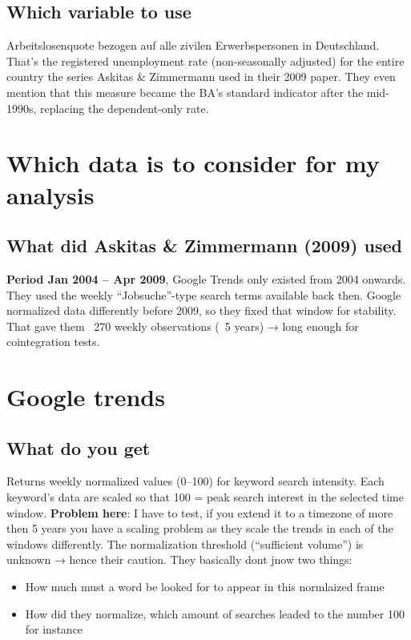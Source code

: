 \documentclass{article}
\begin{document}
\subsection{Which variable to use}
Arbeitslosenquote bezogen auf alle zivilen Erwerbspersonen in Deutschland.
That’s the registered unemployment rate (non-seasonally adjusted) for the entire country  the series Askitas \& Zimmermann used in their 2009 paper. They even mention that this measure became the BA’s standard indicator after the mid-1990s, replacing the dependent-only rate.

\section{Which data is to consider for my analysis}

\subsection{What did Askitas \& Zimmermann (2009) used}
\textbf{Period Jan 2004 – Apr 2009}, Google Trends only existed from 2004 onwards.
They used the weekly “Jobsuche”-type search terms available back then.
Google normalized data differently before 2009, so they fixed that window for stability.
That gave them ~270 weekly observations (~5 years) → long enough for cointegration tests.

\section{Google trends}

\subsection{What do you get}
Returns weekly normalized values (0–100) for keyword search intensity. Each keyword’s data are scaled so that 100 = peak search interest in the selected time window. \textbf{Problem here}: I have to test, if you extend it to a timezone of more then 5 years you have a scaling problem as they scale the trends in each of the windows differently. The normalization threshold (“sufficient volume”) is unknown → hence their caution.
They basically dont jnow two things:
\begin{itemize}
    \item How much must a word be looked for to appear in this normlaized frame
    \item How did they normalize, which amount of searches leaded to the number 100 for instance
\end{itemize}
\end{document}

